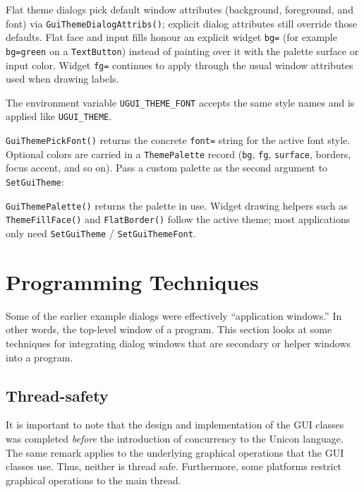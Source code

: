 Flat theme dialogs pick default window attributes (background,
foreground, and font) via \texttt{GuiThemeDialogAttribs()}; explicit
dialog attributes still override those defaults. Flat face and input
fills honour an explicit widget \texttt{bg=} (for example
\texttt{bg=green} on a \texttt{TextButton}) instead of painting over
it with the palette surface or input color. Widget \texttt{fg=}
continues to apply through the usual window attributes used when
drawing labels.


\noindent
The environment variable \texttt{UGUI\_THEME\_FONT} accepts the same
style names and is applied like \texttt{UGUI\_THEME}.

\noindent
\texttt{GuiThemePickFont()} returns the concrete \texttt{font=}
string for the active font style. Optional colors are carried in a
\texttt{ThemePalette} record (\texttt{bg}, \texttt{fg},
\texttt{surface}, borders, focus accent, and so on). Pass a custom
palette as the second argument to \texttt{SetGuiTheme}:


\noindent
\texttt{GuiThemePalette()} returns the palette in use.
Widget drawing helpers such as \texttt{ThemeFillFace()} and
\texttt{FlatBorder()} follow the active theme; most applications only
need \texttt{SetGuiTheme} / \texttt{SetGuiThemeFont}.

\section{Programming Techniques}

Some of the earlier example dialogs were effectively
``application windows.'' In other words, the
top-level window of a program. This section looks at some techniques
for integrating dialog windows that are secondary or helper windows
into a program.

\subsection*{Thread-safety}
It is important to note that the design and implementation of the GUI classes was
completed {\em before }the introduction of concurrency to the Unicon language.
The same remark applies to the underlying graphical operations that the GUI classes
use. Thus, neither is thread safe. Furthermore, some platforms restrict graphical
operations to the main thread.

